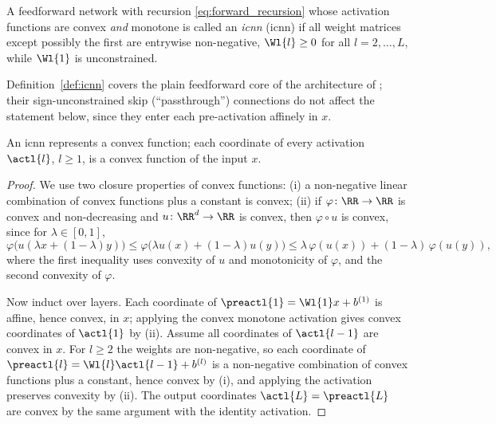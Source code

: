 \begin{definition}\label{def:icnn}
A feedforward network with recursion \eqref{eq:forward_recursion} whose activation functions are convex \emph{and} monotone is called an \emph{\acl{icnn}} (\acs{icnn}) if all weight matrices except possibly the first are entrywise non-negative, $\Wl{l} \ge 0$ for all $l = 2, \ldots, L$, while $\Wl{1}$ is unconstrained.
\end{definition}

Definition~\ref{def:icnn} covers the plain feedforward core of the architecture of \textcite{Amos2017}; their sign-unconstrained skip (``passthrough'') connections do not affect the statement below, since they enter each pre-activation affinely in $x$.

\begin{proposition}\label{prop:icnn_convex}
An \ac{icnn} represents a convex function; each coordinate of every activation $\actl{l}$, $l \ge 1$, is a convex function of the input $x$.
\hfill{}
\end{proposition}

\begin{proof}
We use two closure properties of convex functions: (i) a non-negative linear combination of convex functions plus a constant is convex; (ii) if $\varphi \colon \RR \to \RR$ is convex and non-decreasing and $u \colon \RR^d \to \RR$ is convex, then $\varphi \circ u$ is convex, since for $\lambda \in [0,1]$,
\begin{equation*}
	\varphi\bigl(u(\lambda x + (1-\lambda) y)\bigr)
	\le \varphi\bigl(\lambda u(x) + (1-\lambda) u(y)\bigr)
	\le \lambda\, \varphi(u(x)) + (1-\lambda)\, \varphi(u(y)),
\end{equation*}
where the first inequality uses convexity of $u$ and monotonicity of $\varphi$, and the second convexity of $\varphi$.

Now induct over layers. Each coordinate of $\preactl{1} = \Wl{1} x + b^{(1)}$ is affine, hence convex, in $x$; applying the convex monotone activation gives convex coordinates of $\actl{1}$ by (ii). Assume all coordinates of $\actl{l-1}$ are convex in $x$. For $l \ge 2$ the weights are non-negative, so each coordinate of $\preactl{l} = \Wl{l} \actl{l-1} + b^{(l)}$ is a non-negative combination of convex functions plus a constant, hence convex by (i), and applying the activation preserves convexity by (ii). The output coordinates $\actl{L} = \preactl{L}$ are convex by the same argument with the identity activation.
\end{proof}

